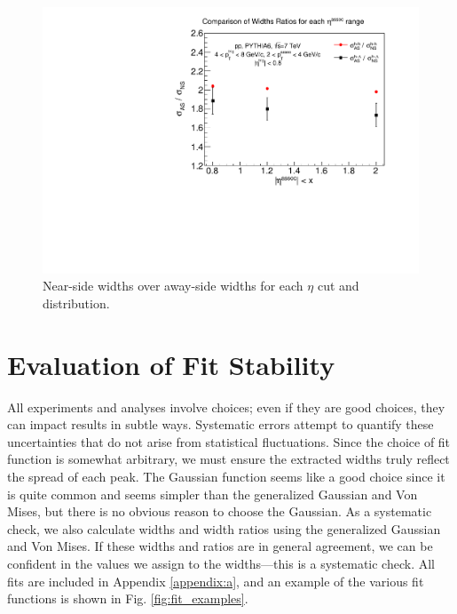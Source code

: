 \documentclass[../main.tex]{subfiles}
\begin{document}
\FloatBarrier
\begin{figure}[h]
    \centering
    \includegraphics[scale=0.5]{results/figs/away-over-near.pdf}
    \caption{Near-side widths over away-side widths for each $\eta$ cut and distribution.}
    \label{fig:as_over_ns}
\end{figure}
\FloatBarrier

\section{Evaluation of Fit Stability}
All experiments and analyses involve choices; even if they are good choices, they can impact results in subtle ways. Systematic errors attempt to quantify these uncertainties that do not arise from statistical fluctuations. Since the choice of fit function is somewhat arbitrary, we must ensure the extracted widths truly reflect the spread of each peak. The Gaussian function seems like a good choice since it is quite common and seems simpler than the generalized Gaussian and Von Mises, but there is no obvious reason to choose the Gaussian. As a systematic check, we also calculate widths and width ratios using the generalized Gaussian and Von Mises. If these widths and ratios are in general agreement, we can be confident in the values we assign to the widths---this is a systematic check. All fits are included in Appendix \ref{appendix:a}, and an example of the various fit functions is shown in Fig. \ref{fig:fit_examples}. 
\end{document}
